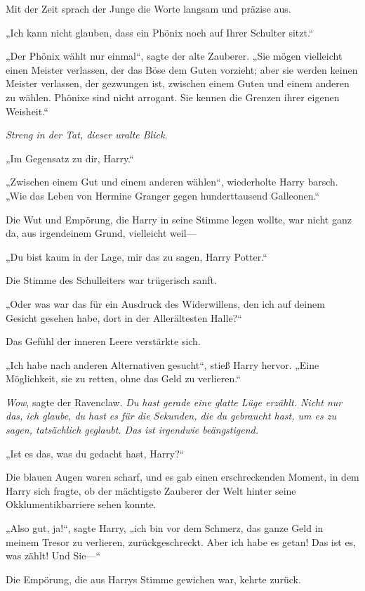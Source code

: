 {Mit der Zeit sprach der Junge die Worte langsam und präzise aus.

„Ich kann nicht glauben, dass ein Phönix noch auf Ihrer Schulter sitzt.“

„Der Phönix wählt nur einmal“, sagte der alte Zauberer. „Sie mögen vielleicht einen Meister verlassen, der das Böse dem Guten vorzieht; aber sie werden keinen Meister verlassen, der gezwungen ist, zwischen einem Guten und einem anderen zu wählen. Phönixe sind nicht arrogant. Sie kennen die Grenzen ihrer eigenen Weisheit.“

\emph{Streng in der Tat, dieser uralte Blick.}

„Im Gegensatz zu dir, Harry.“

„Zwischen einem Gut und einem anderen wählen“, wiederholte Harry barsch. „Wie das Leben von Hermine Granger gegen hunderttausend Galleonen.“

Die Wut und Empörung, die Harry in seine Stimme legen wollte, war nicht ganz da, aus irgendeinem Grund, vielleicht weil—

„Du bist kaum in der Lage, mir das zu sagen, Harry Potter.“

Die Stimme des Schulleiters war trügerisch sanft.

„Oder was war das für ein Ausdruck des Widerwillens, den ich auf deinem Gesicht gesehen habe, dort in der Allerältesten Halle?“

Das Gefühl der inneren Leere verstärkte sich.

„Ich habe nach anderen Alternativen gesucht“, stieß Harry hervor. „Eine Möglichkeit, sie zu retten, ohne das Geld zu verlieren.“

\emph{Wow}, sagte der Ravenclaw. \emph{Du hast gerade eine glatte Lüge erzählt. Nicht nur das, ich glaube, du hast es für die Sekunden, die du gebraucht hast, um es zu sagen, tatsächlich geglaubt. Das ist irgendwie beängstigend.}

„Ist es das, was du gedacht hast, Harry?“

Die blauen Augen waren scharf, und es gab einen erschreckenden Moment, in dem Harry sich fragte, ob der mächtigste Zauberer der Welt hinter seine Okklumentikbarriere sehen konnte.

„Also gut, ja!“, sagte Harry, „ich bin vor dem Schmerz, das ganze Geld in meinem Tresor zu verlieren, zurückgeschreckt. Aber ich habe es getan! Das ist es, was zählt! Und Sie—“

Die Empörung, die aus Harrys Stimme gewichen war, kehrte zurück.

}
